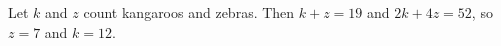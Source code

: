 Let $k$ and $z$ count kangaroos and zebras. Then $k+z=19$ and $2k+4z=52$, so $z=7$ and $\boxed{k=12}$.
